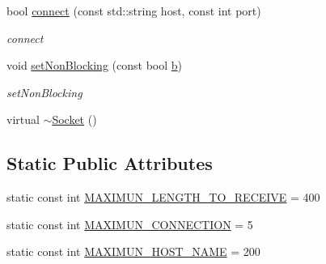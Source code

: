 \begin{DoxyCompactItemize}
bool \hyperlink{class_socket_afe535648cf44461c6ded1b2d72056d47}{connect} (const std\-::string host, const int port)
\begin{DoxyCompactList}\small\item\em connect \end{DoxyCompactList}\item 
void \hyperlink{class_socket_ad97992fa51319cdf4d5d75c8bb49d100}{set\-Non\-Blocking} (const bool \hyperlink{jquery_8js_a2fa551895933fae935a0a6b87282241d}{b})
\begin{DoxyCompactList}\small\item\em set\-Non\-Blocking \end{DoxyCompactList}\item 
virtual \hyperlink{class_socket_aeac4eb6379a543d38ed88977d3b6630a}{$\sim$\-Socket} ()
\end{DoxyCompactItemize}
\subsection*{Static Public Attributes}
\begin{DoxyCompactItemize}
\item 
static const int \hyperlink{class_socket_a95e54f0602448bae84d85145a8720997}{M\-A\-X\-I\-M\-U\-N\-\_\-\-L\-E\-N\-G\-T\-H\-\_\-\-T\-O\-\_\-\-R\-E\-C\-E\-I\-V\-E} = 400
\item 
static const int \hyperlink{class_socket_a7e2ace3442918efea281250bf3833d06}{M\-A\-X\-I\-M\-U\-N\-\_\-\-C\-O\-N\-N\-E\-C\-T\-I\-O\-N} = 5
\item 
static const int \hyperlink{class_socket_a41f1845f6cf98d227b32e15f0c9467db}{M\-A\-X\-I\-M\-U\-N\-\_\-\-H\-O\-S\-T\-\_\-\-N\-A\-M\-E} = 200
\end{DoxyCompactItemize}


